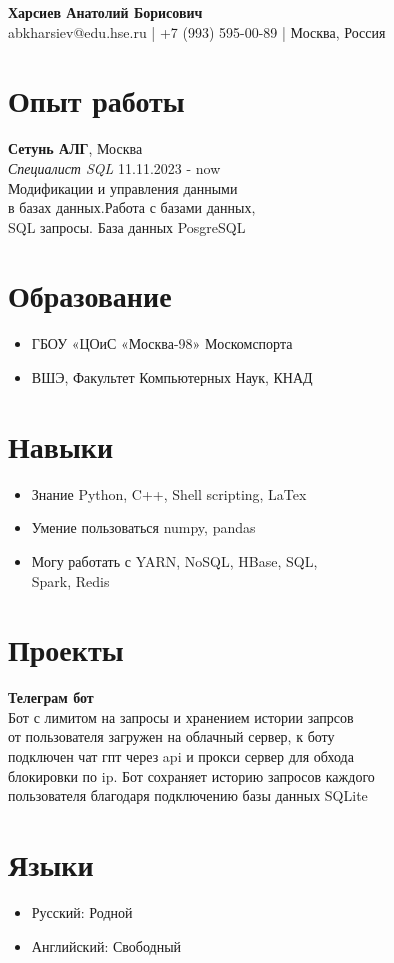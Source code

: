 \documentclass[a4paper,12pt]{article}
\begin{document}
\begin{center}
    \Huge\textbf{{Харсиев Анатолий Борисович}}\\
    \normalsize{abkharsiev@edu.hse.ru | +7 (993) 595-00-89 | Москва, Россия}
\end{center}

\section*{Опыт работы}
\large{
\textbf{Сетунь АЛГ}, Москва \\
\emph{Специалист SQL} \hfill 11.11.2023 - now \\
Модификации и управления данными\\
в базах данных.Работа с базами данных,\\
SQL запросы. База данных PosgreSQL}



\section*{Образование}
\begin{itemize}
    \item ГБОУ «ЦОиС «Москва-98» Москомспорта
    \item ВШЭ, Факультет Компьютерных Наук, КНАД
\end{itemize}
 

\section*{Навыки}
\begin{itemize}
    \item Знание Python, C++, Shell scripting, LaTex
    \item Умение пользоваться numpy, pandas
    \item Могу работать с YARN, NoSQL, HBase, SQL,\\
    Spark, Redis
\end{itemize}

\section*{Проекты}
\textbf{Телеграм бот} \\
\large{Бот с лимитом на запросы и хранением истории запрсов\\
от пользователя загружен на облачный сервер, к боту\\
подключен чат гпт через api и прокси сервер для обхода \\
блокировки по ip. Бот сохраняет историю запросов каждого\\
пользователя благодаря подключению базы данных SQLite}

\section*{Языки}
\begin{itemize}
    \item Русский: Родной
    \item Английский: Свободный 
\end{itemize}
\end{document}
